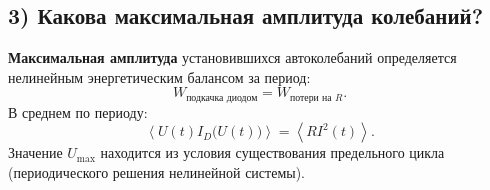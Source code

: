 \documentclass[11pt,a4paper]{article}
\begin{document}
\subsection{3) Какова максимальная амплитуда колебаний?}
\textbf{Максимальная амплитуда} установившихся автоколебаний определяется нелинейным энергетическим балансом за период:
\[
W_{\text{подкачка диодом}} = W_{\text{потери на }R}.
\]
В среднем по периоду:
\[
\left\langle U(t)I_D\bigl(U(t)\bigr)\right\rangle
=
\left\langle RI^2(t)\right\rangle.
\]
Значение $U_{\max}$ находится из условия существования предельного цикла (периодического решения нелинейной системы).
\end{document}
